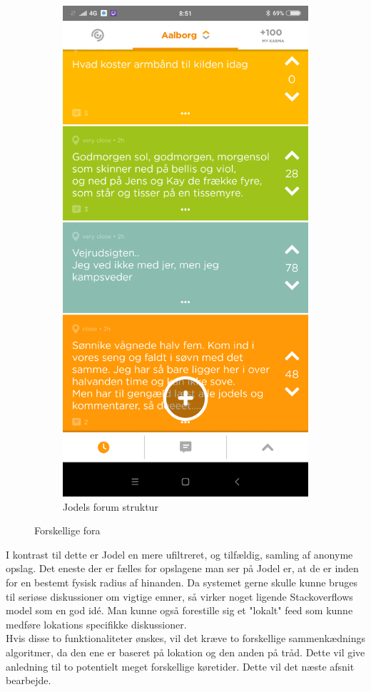 \begin{figure}[H]
\begin{subfigure}{0.5\textwidth}
        \includegraphics[width=0.7\linewidth]{Projectdoc/Assets/Illustrationer/jodel_forum_eksempel.png}
        \caption{Jodels forum struktur}
        \label{fig:jodel_forum}
    \end{subfigure}
    \caption{Forskellige fora}
    \label{fig:forskellige_fora}
\end{figure}

I kontrast til dette er Jodel en mere ufiltreret, og tilfældig, samling af anonyme opslag. Det eneste der er fælles for opslagene man ser på Jodel er, at de er inden for en bestemt fysisk radius af hinanden.
Da systemet gerne skulle kunne bruges til seriøse diskussioner om vigtige emner, så virker noget ligende Stackoverflows model som en god idé. Man kunne også forestille sig et "lokalt" feed som kunne medføre lokations specifikke diskussioner.\\
Hvis disse to funktionaliteter ønskes, vil det kræve to forskellige sammenkædnings algoritmer, da den ene er baseret på lokation og den anden på tråd. Dette vil give anledning til to potentielt meget forskellige køretider. Dette vil det næste afsnit bearbejde.

